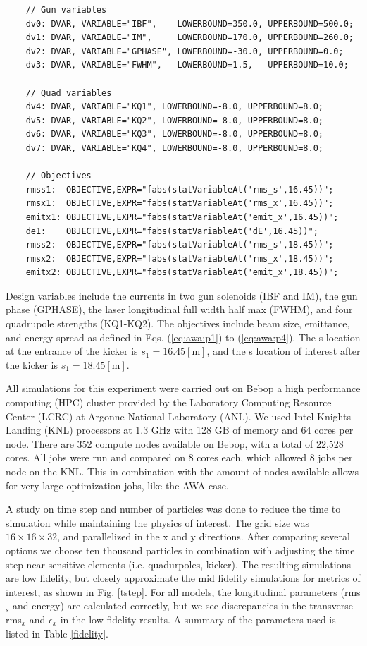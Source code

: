 \vspace{0.2cm}
{\footnotesize \begin{verbatim}
	// Gun variables
	dv0: DVAR, VARIABLE="IBF",    LOWERBOUND=350.0, UPPERBOUND=500.0;
	dv1: DVAR, VARIABLE="IM",     LOWERBOUND=170.0, UPPERBOUND=260.0;
	dv2: DVAR, VARIABLE="GPHASE", LOWERBOUND=-30.0, UPPERBOUND=0.0;
	dv3: DVAR, VARIABLE="FWHM",   LOWERBOUND=1.5,   UPPERBOUND=10.0;
	
	// Quad variables
	dv4: DVAR, VARIABLE="KQ1", LOWERBOUND=-8.0, UPPERBOUND=8.0;
	dv5: DVAR, VARIABLE="KQ2", LOWERBOUND=-8.0, UPPERBOUND=8.0;
	dv6: DVAR, VARIABLE="KQ3", LOWERBOUND=-8.0, UPPERBOUND=8.0;
	dv7: DVAR, VARIABLE="KQ4", LOWERBOUND=-8.0, UPPERBOUND=8.0;
	
	// Objectives
	rmss1:  OBJECTIVE,EXPR="fabs(statVariableAt('rms_s',16.45))";
	rmsx1:  OBJECTIVE,EXPR="fabs(statVariableAt('rms_x',16.45))";
	emitx1: OBJECTIVE,EXPR="fabs(statVariableAt('emit_x',16.45))";
	de1:    OBJECTIVE,EXPR="fabs(statVariableAt('dE',16.45))";	
	rmss2:  OBJECTIVE,EXPR="fabs(statVariableAt('rms_s',18.45))";
	rmsx2:  OBJECTIVE,EXPR="fabs(statVariableAt('rms_x',18.45))";
	emitx2: OBJECTIVE,EXPR="fabs(statVariableAt('emit_x',18.45))";

	\end{verbatim}}
\vspace{0.2cm}

Design variables include the currents in two gun solenoids (IBF and IM), 
the gun phase (GPHASE), the laser longitudinal full width half max (FWHM), 
and four quadrupole strengths (KQ1-KQ2). The objectives include
beam size, emittance, and energy spread as
defined in Eqs. (\ref{eq:awa:p1}) to (\ref{eq:awa:p4}). 
The s location at the entrance of the kicker is $s_1=16.45[\text{m}]$, 
and the s location of interest after the kicker is $s_1=18.45[\text{m}]$. 

All simulations for this experiment were carried out on Bebop a
high performance computing (HPC)
cluster provided by the Laboratory Computing Resource Center (LCRC)
at Argonne National Laboratory (ANL). We used Intel Knights Landing 
(KNL) processors at 1.3 GHz with 128 GB of memory 
and 64 cores per node. There are 352 compute nodes available on 
Bebop, with a total of 22,528 cores. All jobs were run and compared 
on 8 cores each, which allowed 8 jobs per node on the KNL.
This in combination with the amount of nodes available 
allows for very large optimization jobs, like the AWA case.

A study on time step and 
number of particles was done to reduce the time to simulation while 
maintaining the physics of interest. 
The grid size was $16 \times 16 \times 32$, 
and parallelized in the x and y directions.
After comparing several options we choose ten thousand particles 
in combination with adjusting the time step near sensitive elements 
(i.e. quadurpoles, kicker). 
The resulting simulations are low fidelity, but closely approximate 
the mid fidelity simulations for metrics of interest, as shown in 
Fig. \ref{tstep}. For all models, the longitudinal parameters (rms$_s$ and energy) 
are calculated correctly, but we see discrepancies in the transverse 
rms$_x$ and $\epsilon_x$ in the low fidelity results. A summary of 
the parameters used is listed in Table \ref{fidelity}. 

